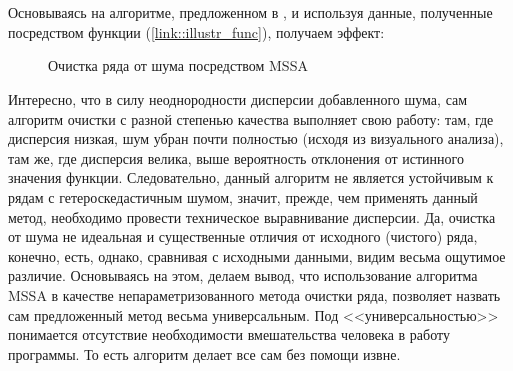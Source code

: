 \\\\
Основываясь на алгоритме, предложенном в \cite{kuang2020efficient}, и используя данные, полученные посредством функции (\ref{link::illustr_func}), получаем эффект:
\begin{figure}[H]
	\centering
	\caption{Очистка ряда от шума посредством MSSA}
\end{figure}
\noindent Интересно, что в силу неоднородности дисперсии добавленного шума, сам алгоритм очистки с разной степенью качества выполняет свою работу: там, где дисперсия низкая, шум убран почти полностью (исходя из визуального анализа), там же, где дисперсия велика, выше вероятность отклонения от истинного значения функции. Следовательно, данный алгоритм не является устойчивым к рядам с гетероскедастичным шумом, значит, прежде, чем применять данный метод, необходимо провести техническое выравнивание дисперсии. Да, очистка от шума не идеальная и существенные отличия от исходного (чистого) ряда, конечно, есть, однако, сравнивая с исходными данными, видим весьма ощутимое различие. Основываясь на этом, делаем вывод, что использование алгоритма MSSA в качестве непараметризованного метода очистки ряда, позволяет назвать сам предложенный метод весьма универсальным. Под <<универсальностью>> понимается отсутствие необходимости вмешательства человека в работу программы. То есть алгоритм делает все сам без помощи извне. 

